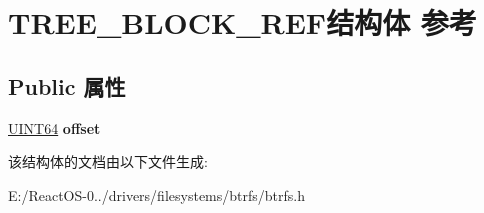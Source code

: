 \hypertarget{struct_t_r_e_e___b_l_o_c_k___r_e_f}{}\section{T\+R\+E\+E\+\_\+\+B\+L\+O\+C\+K\+\_\+\+R\+E\+F结构体 参考}
\label{struct_t_r_e_e___b_l_o_c_k___r_e_f}
\subsection*{Public 属性}
\begin{DoxyCompactItemize}
\item 
\mbox{\label{struct_t_r_e_e___b_l_o_c_k___r_e_f_ab8b07cd3706787e9173281becea50862}} 
\hyperlink{_processor_bind_8h_a57be03562867144161c1bfee95ca8f7c}{U\+I\+N\+T64} {\bfseries offset}
\end{DoxyCompactItemize}


该结构体的文档由以下文件生成\+:\begin{DoxyCompactItemize}
\item 
E\+:/\+React\+O\+S-\/0../drivers/filesystems/btrfs/btrfs.\+h\end{DoxyCompactItemize}
